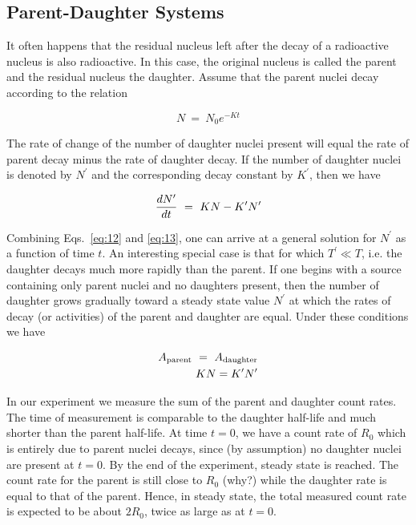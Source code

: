\subsection{Parent-Daughter Systems}
\label{sec:parent-daughter}

It often happens that the residual nucleus left after the decay of a
radioactive nucleus is also radioactive.  In this case, the original
nucleus is called the parent and the residual nucleus the daughter.
Assume that the parent nuclei decay according to the relation

\begin{equation}
N ~=~ N_0 e^{-Kt}
\label{eq:12}
\end{equation}

The rate of change of the number of daughter nuclei present will equal
the rate of parent decay minus the rate of daughter decay.  If the
number of daughter nuclei is denoted by $N^\prime$ and the
corresponding decay constant by $K^\prime$, then we have

\begin{equation}
{dN^\prime \over dt} ~=~ KN - K^\prime N^\prime
\label{eq:13}
\end{equation}

Combining Eqs.~\ref{eq:12} and \ref{eq:13}, one can arrive at a general solution for
$N^\prime$ as a function of time $t$.
An interesting special case is that for which
$T^\prime \ll T$, i.e. the daughter decays
much more rapidly than the parent. If one begins with a source
containing only parent nuclei and no daughters present, then the
number of daughter grows gradually toward a steady
state value $N^\prime$ at which the rates of decay (or
activities) of the parent and daughter are equal.  Under these
conditions we have

\begin{eqnarray}
A_{\rm parent} ~=~ A_{\rm daughter} \\
KN = K^\prime N^\prime
\label{eq:14}
\end{eqnarray}

In our experiment we measure the sum of the parent and daughter count
rates.  The time of measurement is comparable to the daughter
half-life and much shorter than the parent half-life.  At time $t = 0$,
we have a count rate of $R_0$ which is entirely due to
parent nuclei decays, since (by assumption) no daughter nuclei are
present at $t = 0$.  By the end of the experiment, steady state is reached.
The count rate for the parent is still close
to $R_0$ (why?) while the daughter rate is equal to that
of the parent.  Hence, in steady state, the total measured count rate
is expected to be about $2R_0$, twice as large as at $t = 0$.

